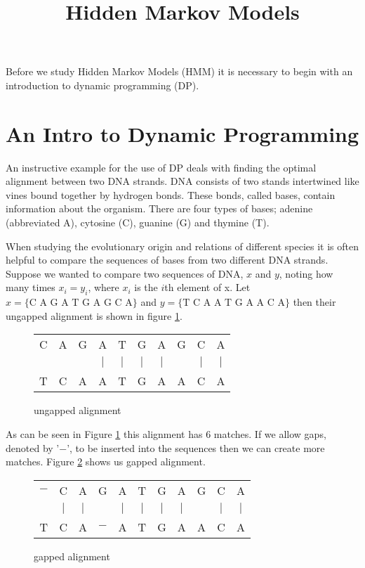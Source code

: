 \documentclass{article}
\title{Hidden Markov Models}
\numberwithin{equation}{section}
\begin{document}
\maketitle

Before we study Hidden Markov Models (HMM) it is necessary to begin
with an introduction to dynamic programming (DP).

\section{An Intro to Dynamic Programming}
An instructive example for the use of DP deals with finding the
optimal alignment between two DNA strands.  DNA consists of two
stands intertwined like vines bound together by hydrogen bonds.
These bonds, called bases, contain information about the organism.
There are four types of bases; adenine (abbreviated A), cytosine
(C), guanine (G) and thymine (T).

When studying the evolutionary origin and relations of different
species it is often helpful to compare the sequences of bases from
two different DNA strands. Suppose we wanted to compare two
sequences of DNA, $x$ and $y$, noting how many times $x_i=y_i$,
where $x_i$ is the $i$th element of x. Let $x=\{\textrm{C A G A T G
A G C A}\}$ and $y=\{\textrm{T C A A T G A A C A}\}$ then their
ungapped alignment is shown in figure \ref{ungapped}.

\begin{figure}[h]
\centering
\begin{tabular}{cccccccccc}
  C & A & G & A & T & G & A & G & C & A \\
   &  &  & $\mid$ & $\mid$ & $\mid$ & $\mid$ &  & $\mid$ & $\mid$ \\
  T & C & A & A & T & G & A & A & C & A \\
\end{tabular}
\caption{ungapped alignment} \label{ungapped}
\end{figure}

As can be seen in Figure \ref{ungapped} this alignment has 6
matches. If we allow gaps, denoted by '$-$', to be inserted into the
sequences then we can create more matches.  Figure \ref{gap} shows
us gapped alignment.

\begin{figure}[h]
\centering
\begin{tabular}{ccccccccccc}
$-$ & C & A & G & A & T & G & A & G & C & A \\
  & $\mid$ & $\mid$ & & $\mid$ & $\mid$ & $\mid$ & $\mid$ & & $\mid$ & $\mid$ \\
T & C & A & $-$ & A & T & G & A & A & C & A \\
\end{tabular}
\caption{gapped alignment} \label{gap}
\end{figure}
\end{document}
